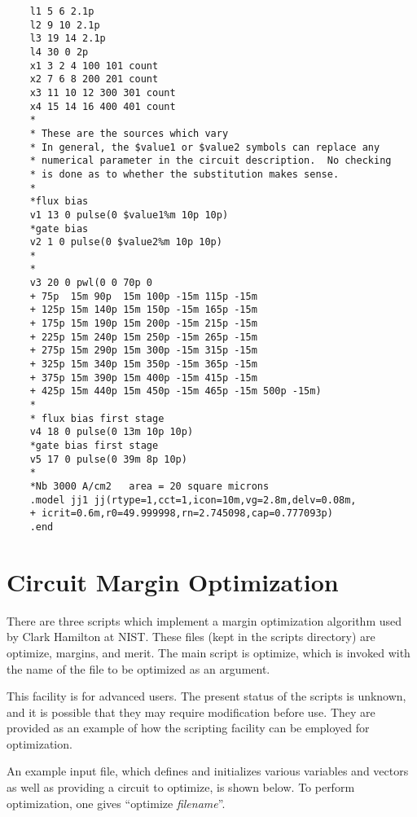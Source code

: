 \begin{verbatim}
    l1 5 6 2.1p
    l2 9 10 2.1p
    l3 19 14 2.1p
    l4 30 0 2p
    x1 3 2 4 100 101 count
    x2 7 6 8 200 201 count
    x3 11 10 12 300 301 count
    x4 15 14 16 400 401 count
    *
    * These are the sources which vary
    * In general, the $value1 or $value2 symbols can replace any
    * numerical parameter in the circuit description.  No checking
    * is done as to whether the substitution makes sense.
    *
    *flux bias
    v1 13 0 pulse(0 $value1%m 10p 10p)
    *gate bias
    v2 1 0 pulse(0 $value2%m 10p 10p)
    *
    *
    v3 20 0 pwl(0 0 70p 0
    + 75p  15m 90p  15m 100p -15m 115p -15m 
    + 125p 15m 140p 15m 150p -15m 165p -15m
    + 175p 15m 190p 15m 200p -15m 215p -15m
    + 225p 15m 240p 15m 250p -15m 265p -15m
    + 275p 15m 290p 15m 300p -15m 315p -15m
    + 325p 15m 340p 15m 350p -15m 365p -15m
    + 375p 15m 390p 15m 400p -15m 415p -15m
    + 425p 15m 440p 15m 450p -15m 465p -15m 500p -15m)
    *
    * flux bias first stage
    v4 18 0 pulse(0 13m 10p 10p)
    *gate bias first stage
    v5 17 0 pulse(0 39m 8p 10p)
    *
    *Nb 3000 A/cm2   area = 20 square microns
    .model jj1 jj(rtype=1,cct=1,icon=10m,vg=2.8m,delv=0.08m,
    + icrit=0.6m,r0=49.999998,rn=2.745098,cap=0.777093p)
    .end
\end{verbatim}


\section{Circuit Margin Optimization}


There are three scripts which implement a margin optimization
algorithm used by Clark Hamilton at NIST.  These files (kept in the
scripts directory) are {\vt optimize}, {\vt margins}, and {\vt merit}. 
The main script is {\vt optimize}, which is invoked with the name of
the file to be optimized as an argument.

This facility is for advanced users.  The present status of the
scripts is unknown, and it is possible that they may require
modification before use.  They are provided as an example of how the
{\WRspice} scripting facility can be employed for optimization.

An example input file, which defines and initializes various variables
and vectors as well as providing a circuit to optimize, is shown
below.  To perform optimization, one gives ``{\vt optimize} {\it
filename}''.


